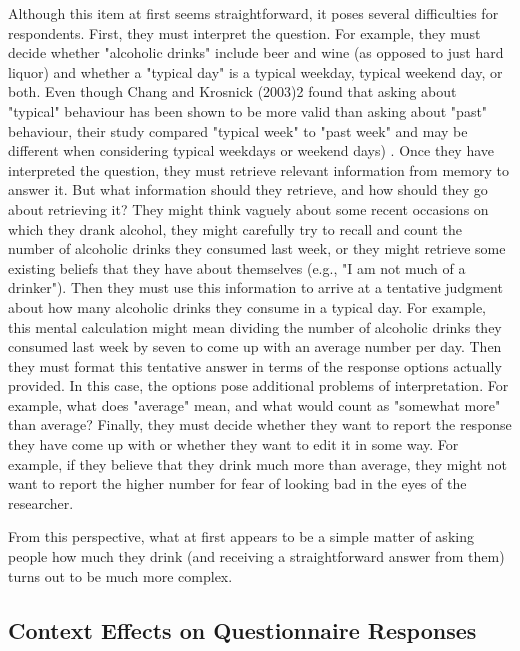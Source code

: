Although this item at first seems straightforward, it poses several difficulties for respondents. First, they must interpret the question. For example, they must decide whether "alcoholic drinks" include beer and wine (as opposed to just hard liquor) and whether a "typical day" is a typical weekday, typical weekend day, or both. Even though Chang and Krosnick (2003)2 found that asking about "typical" behaviour has been shown to be more valid than asking about "past" behaviour, their study compared "typical week" to "past week" and may be different when considering typical weekdays or weekend days) . Once they have interpreted the question, they must retrieve relevant information from memory to answer it. But what information should they retrieve, and how should they go about retrieving it? They might think vaguely about some recent occasions on which they drank alcohol, they might carefully try to recall and count the number of alcoholic drinks they consumed last week, or they might retrieve some existing beliefs that they have about themselves (e.g., "I am not much of a drinker"). Then they must use this information to arrive at a tentative judgment about how many alcoholic drinks they consume in a typical day. For example, this mental calculation might mean dividing the number of alcoholic drinks they consumed last week by seven to come up with an average number per day. Then they must format this tentative answer in terms of the response options actually provided. In this case, the options pose additional problems of interpretation. For example, what does "average" mean, and what would count as "somewhat more" than average? Finally, they must decide whether they want to report the response they have come up with or whether they want to edit it in some way. For example, if they believe that they drink much more than average, they might not want to report the higher number for fear of looking bad in the eyes of the researcher.

From this perspective, what at first appears to be a simple matter of asking people how much they drink (and receiving a straightforward answer from them) turns out to be much more complex.

\subsection{Context Effects on Questionnaire Responses}


